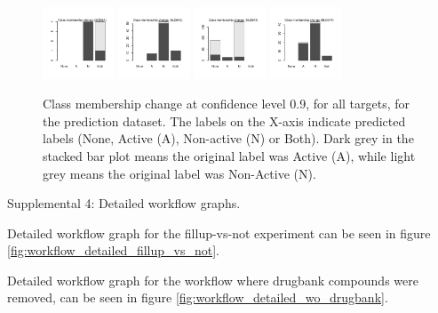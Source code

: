 \documentclass[utf8]{frontiersSCNS} %
\begin{document}
\begin{figure}[h!]
\includegraphics[width=0.19\textwidth]{figures/validation_plots/scn5a_0p9_valplot.pdf}
\includegraphics[width=0.19\textwidth]{figures/validation_plots/slc6a2_0p9_valplot.pdf}
\includegraphics[width=0.19\textwidth]{figures/validation_plots/slc6a3_0p9_valplot.pdf}
\includegraphics[width=0.19\textwidth]{figures/validation_plots/slc6a4_0p9_valplot.pdf}
    \caption{Class membership change at confidence level 0.9, for all targets,
    for the prediction dataset.
    The labels on the X-axis indicate predicted labels (None, Active (A),
    Non-active (N) or Both). Dark grey in the stacked bar plot means the
    original label was Active (A), while light grey means the original label
    was Non-Active (N).
    }
    \label{fig:validation_plots_all_0.9}
\end{figure}

Supplemental 4: Detailed workflow graphs.

Detailed workflow graph for the fillup-vs-not experiment can be seen in figure
\ref{fig:workflow_detailed_fillup_vs_not}.

Detailed workflow graph for the workflow where drugbank compounds were removed,
can be seen in figure \ref{fig:workflow_detailed_wo_drugbank}.
\end{document}
